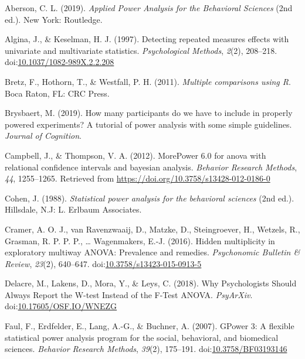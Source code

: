 \documentclass[
  ,jou,floatsintext]{apa6}
\begin{document}
\setlength{\parindent}{-0.5in}
\setlength{\leftskip}{0.5in}

\hypertarget{refs}{}
\leavevmode\hypertarget{ref-aberson_applied_2019}{}%
Aberson, C. L. (2019). \emph{Applied Power Analysis for the Behavioral Sciences} (2nd ed.). New York: Routledge.

\leavevmode\hypertarget{ref-algina_detecting_1997}{}%
Algina, J., \& Keselman, H. J. (1997). Detecting repeated measures effects with univariate and multivariate statistics. \emph{Psychological Methods}, \emph{2}(2), 208--218. doi:\href{https://doi.org/10.1037/1082-989X.2.2.208}{10.1037/1082-989X.2.2.208}

\leavevmode\hypertarget{ref-bretz_multiple_2011}{}%
Bretz, F., Hothorn, T., \& Westfall, P. H. (2011). \emph{Multiple comparisons using R}. Boca Raton, FL: CRC Press.

\leavevmode\hypertarget{ref-brysbaert_how_2019}{}%
Brysbaert, M. (2019). How many participants do we have to include in properly powered experiments? A tutorial of power analysis with some simple guidelines. \emph{Journal of Cognition}.

\leavevmode\hypertarget{ref-Campbell2012MorePower6F}{}%
Campbell, J., \& Thompson, V. A. (2012). MorePower 6.0 for anova with relational confidence intervals and bayesian analysis. \emph{Behavior Research Methods}, \emph{44}, 1255--1265. Retrieved from \url{https://doi.org/10.3758/s13428-012-0186-0}

\leavevmode\hypertarget{ref-cohen_statistical_1988}{}%
Cohen, J. (1988). \emph{Statistical power analysis for the behavioral sciences} (2nd ed.). Hillsdale, N.J: L. Erlbaum Associates.

\leavevmode\hypertarget{ref-cramer_hidden_2016}{}%
Cramer, A. O. J., van Ravenzwaaij, D., Matzke, D., Steingroever, H., Wetzels, R., Grasman, R. P. P. P., \ldots{} Wagenmakers, E.-J. (2016). Hidden multiplicity in exploratory multiway ANOVA: Prevalence and remedies. \emph{Psychonomic Bulletin \& Review}, \emph{23}(2), 640--647. doi:\href{https://doi.org/10.3758/s13423-015-0913-5}{10.3758/s13423-015-0913-5}

\leavevmode\hypertarget{ref-delacre_why_2018}{}%
Delacre, M., Lakens, D., Mora, Y., \& Leys, C. (2018). Why Psychologists Should Always Report the W-test Instead of the F-Test ANOVA. \emph{PsyArXiv}. doi:\href{https://doi.org/10.17605/OSF.IO/WNEZG}{10.17605/OSF.IO/WNEZG}

\leavevmode\hypertarget{ref-faul_gpower_2007}{}%
Faul, F., Erdfelder, E., Lang, A.-G., \& Buchner, A. (2007). GPower 3: A flexible statistical power analysis program for the social, behavioral, and biomedical sciences. \emph{Behavior Research Methods}, \emph{39}(2), 175--191. doi:\href{https://doi.org/10.3758/BF03193146}{10.3758/BF03193146}
\end{document}
